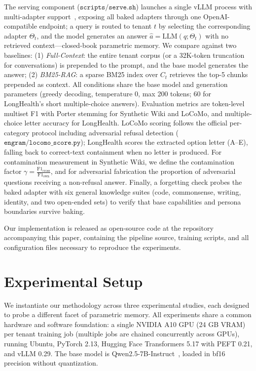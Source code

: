 \documentclass[conference]{IEEEtran}
\begin{document}
The serving component ($\texttt{scripts/serve.sh}$) launches a single vLLM process with multi-adapter support~\cite{kwon2023vllm}, exposing all baked adapters through one OpenAI-compatible endpoint; a query is routed to tenant $t$ by selecting the corresponding adapter $\Theta_t$, and the model generates an answer $\hat{a} = \text{LLM}(q; \Theta_t)$ with no retrieved context---closed-book parametric memory. We compare against two baselines: (1) \textit{Full-Context}: the entire tenant corpus (or a 32K-token truncation for conversations) is prepended to the prompt, and the base model generates the answer; (2) \textit{BM25-RAG}: a sparse BM25 index over $C_t$ retrieves the top-5 chunks prepended as context. All conditions share the base model and generation parameters (greedy decoding, temperature $0$, max 200 tokens; 60 for LongHealth's short multiple-choice answers). Evaluation metrics are token-level multiset F1 with Porter stemming for Synthetic Wiki and LoCoMo, and multiple-choice letter accuracy for LongHealth. LoCoMo scoring follows the official per-category protocol including adversarial refusal detection ($\texttt{engram/locomo\_score.py}$); LongHealth scores the extracted option letter (A--E), falling back to correct-text containment when no letter is produced. For contamination measurement in Synthetic Wiki, we define the contamination factor $\gamma = \frac{\text{F1}_{\text{cross}}}{\text{F1}_{\text{own}}}$, and for adversarial fabrication the proportion of adversarial questions receiving a non-refusal answer. Finally, a forgetting check probes the baked adapter with six general knowledge suites (code, commonsense, writing, identity, and two open-ended sets) to verify that base capabilities and persona boundaries survive baking.

Our implementation is released as open-source code at the repository accompanying this paper, containing the pipeline source, training scripts, and all configuration files necessary to reproduce the experiments.

\section{Experimental Setup}
We instantiate our methodology across three experimental studies, each designed to probe a different facet of parametric memory. All experiments share a common hardware and software foundation: a single NVIDIA A10 GPU (24 GB VRAM) per tenant training job (multiple jobs are chained concurrently across GPUs), running Ubuntu, PyTorch 2.13, Hugging Face Transformers 5.17 with PEFT 0.21, and vLLM 0.29. The base model is Qwen2.5-7B-Instruct~\cite{qwen2025}, loaded in bf16 precision without quantization.
\end{document}

